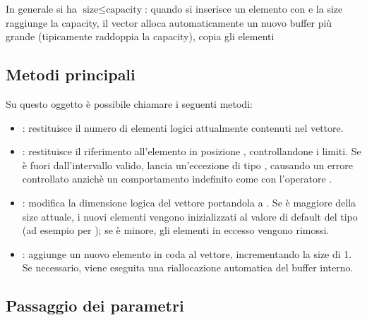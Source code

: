 In generale si ha $\text{size} \leq \text{capacity}$:
quando si inserisce un elemento con  e la size
raggiunge la capacity, il vector alloca automaticamente un nuovo buffer
più grande (tipicamente raddoppia la capacity), copia gli elementi

\subsection{Metodi principali}

Su questo oggetto \`e possibile chiamare i seguenti metodi:

\begin{itemize}
    \item {}: restituisce il numero di elementi logici
          attualmente contenuti nel vettore.

    \item {}: restituisce il riferimento all'elemento
          in posizione , controllandone i limiti.
          Se  \`e fuori dall'intervallo valido,
          lancia un'eccezione di tipo ,
          causando un errore controllato anzich\`e un comportamento
          indefinito come con l'operatore \inlinecode{[]}.

    \item {}: modifica la dimensione logica del
          vettore portandola a . Se  \`e
          maggiore della size attuale, i nuovi elementi vengono
          inizializzati al valore di default del tipo (ad esempio
           per ); se  \`e
          minore, gli elementi in eccesso vengono rimossi.

    \item {}: aggiunge un nuovo elemento
          in coda al vettore, incrementando la size di 1.
          Se necessario, viene eseguita una riallocazione automatica
          del buffer interno.
\end{itemize}

\subsection{Passaggio dei parametri}



